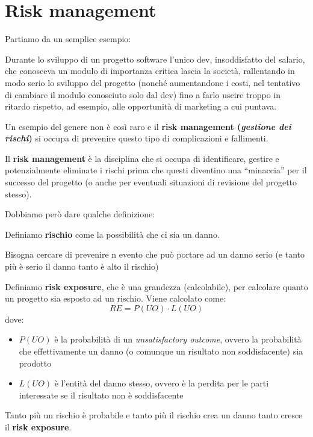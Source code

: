 \documentclass[a4paper,12pt, oneside]{book}
\begin{document}
\chapter{Risk management}
Partiamo da un semplice esempio:
\begin{esempio}
  Durante lo sviluppo di un progetto software l'unico dev, insoddisfatto del
  salario, che conosceva un modulo di importanza critica lascia la società,
  rallentando in modo serio lo sviluppo del progetto (nonché aumentandone i
  costi, nel tentativo di cambiare il modulo conosciuto solo dal dev) fino a
  farlo uscire troppo in ritardo rispetto, ad esempio, alle 
  opportunità di marketing a cui puntava.
  \label{es:ri}
\end{esempio}
Un esempio del genere non è così raro e il \textbf{risk management
  (\textit{gestione dei rischi})} si occupa di prevenire questo tipo di
complicazioni e fallimenti.
\begin{definizione}
  Il \textbf{risk management} è la disciplina che si occupa di identificare,
  gestire e potenzialmente eliminate i rischi prima che questi diventino una
  ``minaccia'' per il successo del progetto (o anche per eventuali situazioni
  di revisione del progetto stesso).
\end{definizione}
Dobbiamo però dare qualche definizione:
\begin{definizione}
  Definiamo \textbf{rischio} come la possibilità che ci sia un danno.
\end{definizione}
Bisogna cercare di prevenire n evento che può portare ad un danno serio (e tanto
più è serio il danno tanto è alto il rischio)
\begin{definizione}
  Definiamo \textbf{risk exposure}, che è una grandezza (calcolabile), per
  calcolare quanto un progetto sia esposto ad un rischio. Viene calcolato come:
  \[RE=P(UO)\cdot L(UO)\]
  dove:
  \begin{itemize}
    \item $P(UO)$ è la probabilità di un \emph{unsatisfactory outcome}, ovvero
    la probabilità che effettivamente un danno (o comunque un risultato non
    soddisfacente) sia prodotto 
    \item $L(UO)$ è l'entità del danno stesso, ovvero è la perdita per le parti
    interessate se il risultato non è soddisfacente
  \end{itemize}
  Tanto più un rischio è probabile e tanto più il rischio crea un danno tanto
  cresce il \textbf{risk exposure}.
\end{definizione}
\end{document}
